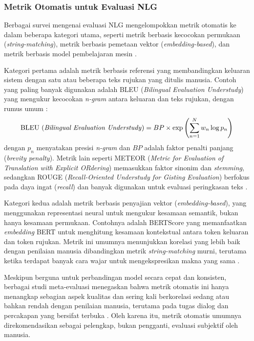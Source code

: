 \subsubsection{Metrik Otomatis untuk Evaluasi NLG}

Berbagai survei mengenai evaluasi NLG mengelompokkan metrik otomatis ke dalam beberapa kategori utama, seperti metrik berbasis kecocokan permukaan (\textit{string-matching}), metrik berbasis pemetaan vektor (\textit{embedding-based}), dan metrik berbasis model pembelajaran mesin \autocite{Celikyilmaz2020EvalTextGen,Sai2020NLGSurvey,Gao2024LLMNLG}.

Kategori pertama adalah metrik berbasis referensi yang membandingkan keluaran sistem dengan satu atau beberapa teks rujukan yang ditulis manusia. Contoh yang paling banyak digunakan adalah BLEU\label{abbr:BLEU} (\textit{Bilingual Evaluation Understudy}) yang mengukur kecocokan \textit{n-gram} antara keluaran dan teks rujukan, dengan rumus umum \autocite{Sai2020NLGSurvey}:
\[
\text{BLEU (\textit{Bilingual Evaluation Understudy})} = BP \times \exp\left(\sum_{n=1}^{N} w_n \log p_n\right)
\]
dengan \(p_n\) menyatakan presisi \textit{n-gram} dan \(BP\) adalah faktor penalti panjang (\textit{brevity penalty}). Metrik lain seperti METEOR (\textit{Metric for Evaluation of Translation with Explicit ORdering}) memasukkan faktor sinonim dan \textit{stemming}, sedangkan ROUGE\label{abbr:ROUGE} (\textit{Recall-Oriented Understudy for Gisting Evaluation}) berfokus pada daya ingat (\textit{recall}) dan banyak digunakan untuk evaluasi peringkasan teks \autocite{Celikyilmaz2020EvalTextGen,Sai2020NLGSurvey}.

Kategori kedua adalah metrik berbasis penyajian vektor (\textit{embedding-based}), yang menggunakan representasi neural untuk mengukur kesamaan semantik, bukan hanya kesamaan permukaan. Contohnya adalah BERTScore yang memanfaatkan \textit{embedding} BERT untuk menghitung kesamaan kontekstual antara token keluaran dan token rujukan. Metrik ini umumnya menunjukkan korelasi yang lebih baik dengan penilaian manusia dibandingkan metrik \textit{string-matching} murni, terutama ketika terdapat banyak cara wajar untuk mengekspresikan makna yang sama \autocite{Celikyilmaz2020EvalTextGen,Gao2024LLMNLG}.

Meskipun berguna untuk perbandingan model secara cepat dan konsisten, berbagai studi meta-evaluasi menegaskan bahwa metrik otomatis ini hanya menangkap sebagian aspek kualitas dan sering kali berkorelasi sedang atau bahkan rendah dengan penilaian manusia, terutama pada tugas dialog dan percakapan yang bersifat terbuka \autocite{Celikyilmaz2020EvalTextGen,Sai2020NLGSurvey,Xiao2023MetricEval}. Oleh karena itu, metrik otomatis umumnya direkomendasikan sebagai pelengkap, bukan pengganti, evaluasi subjektif oleh manusia.

